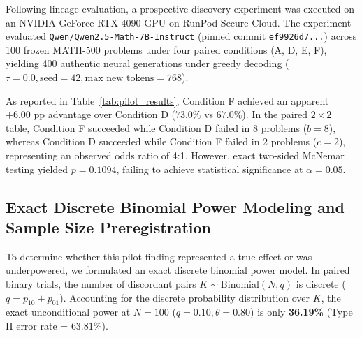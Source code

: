\documentclass[11pt]{article}
\begin{document}
Following lineage evaluation, a prospective discovery experiment was executed on an NVIDIA GeForce RTX 4090 GPU on RunPod Secure Cloud. The experiment evaluated \texttt{Qwen/Qwen2.5-Math-7B-Instruct} (pinned commit \texttt{ef9926d7...}) across 100 frozen MATH-500 problems under four paired conditions (A, D, E, F), yielding 400 authentic neural generations under greedy decoding ($\tau = 0.0, \text{seed} = 42, \text{max new tokens} = 768$).

\begin{table}[t]
\centering
\caption{\textbf{Discovery Pilot Results on MATH-500 ($N=100$, Study 2).} Empirical accuracy, token throughput, and paired statistical contrasts evaluated on NVIDIA RTX 4090 hardware.}
\label{tab:pilot_results}
\end{table}

As reported in Table~\ref{tab:pilot_results}, Condition F achieved an apparent $+6.00\text{ pp}$ advantage over Condition D ($73.0\%$ vs $67.0\%$). In the paired $2 \times 2$ table, Condition F succeeded while Condition D failed in 8 problems ($b = 8$), whereas Condition D succeeded while Condition F failed in 2 problems ($c = 2$), representing an observed odds ratio of 4:1. However, exact two-sided McNemar testing yielded $p = 0.1094$, failing to achieve statistical significance at $\alpha = 0.05$.

\subsection{Exact Discrete Binomial Power Modeling and Sample Size Preregistration}
To determine whether this pilot finding represented a true effect or was underpowered, we formulated an exact discrete binomial power model. In paired binary trials, the number of discordant pairs $K \sim \text{Binomial}(N, q)$ is discrete ($q = p_{10} + p_{01}$). Accounting for the discrete probability distribution over $K$, the exact unconditional power at $N=100$ ($q = 0.10, \theta = 0.80$) is only \textbf{36.19\%} (Type II error rate = $63.81\%$). 
\end{document}
